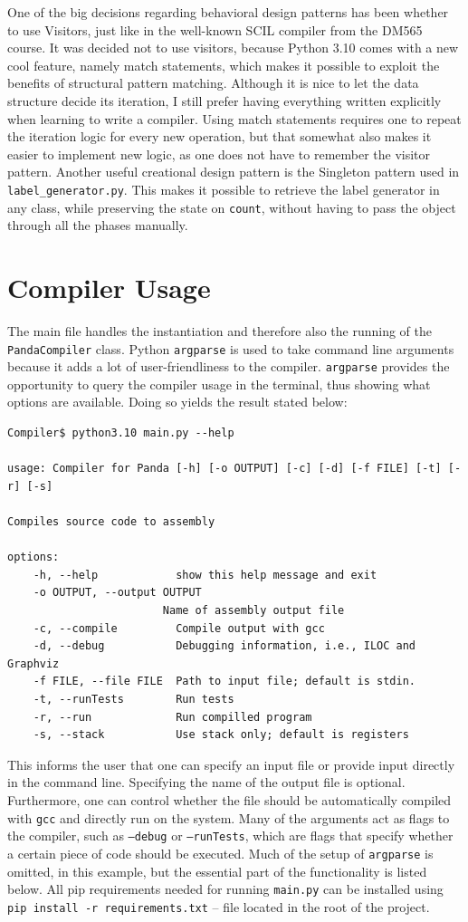 One of the big decisions regarding behavioral design patterns has been whether to use Visitors, just like in the well-known SCIL compiler from the DM565 course. It was decided not to use visitors, because Python 3.10 comes with a new cool feature, namely match statements, which makes it possible to exploit the benefits of structural pattern matching. Although it is nice to let the data structure decide its iteration, I still prefer having everything written explicitly when learning to write a compiler. Using match statements requires one to repeat the iteration logic for every new operation, but that somewhat also makes it easier to implement new logic, as one does not have to remember the visitor pattern. Another useful creational design pattern is the Singleton pattern used in \texttt{label\_generator.py}. This makes it possible to retrieve the label generator in any class, while preserving the state on \texttt{count}, without having to pass the object through all the phases manually.

\section{Compiler Usage}
The main file handles the instantiation and therefore also the running of the \texttt{PandaCompiler} class. Python \texttt{argparse} is used to take command line arguments because it adds a lot of user-friendliness to the compiler. \texttt{argparse} provides the opportunity to query the compiler usage in the terminal, thus showing what options are available. Doing so yields the result stated below:

\begin{verbatim}
Compiler$ python3.10 main.py --help

usage: Compiler for Panda [-h] [-o OUTPUT] [-c] [-d] [-f FILE] [-t] [-r] [-s]

Compiles source code to assembly

options:
    -h, --help            show this help message and exit
    -o OUTPUT, --output OUTPUT
                        Name of assembly output file
    -c, --compile         Compile output with gcc
    -d, --debug           Debugging information, i.e., ILOC and Graphviz
    -f FILE, --file FILE  Path to input file; default is stdin.
    -t, --runTests        Run tests
    -r, --run             Run compilled program
    -s, --stack           Use stack only; default is registers
\end{verbatim}

This informs the user that one can specify an input file or provide input directly in the command line. Specifying the name of the output file is optional. Furthermore, one can control whether the file should be automatically compiled with \texttt{gcc} and directly run on the system. Many of the arguments act as flags to the compiler, such as \texttt{--debug} or \texttt{--runTests}, which are flags that specify whether a certain piece of code should be executed. Much of the setup of \texttt{argparse} is omitted, in this example, but the essential part of the functionality is listed below. All pip requirements needed for running \texttt{main.py} can be installed using \texttt{pip install -r requirements.txt} -- file located in the root of the project.

